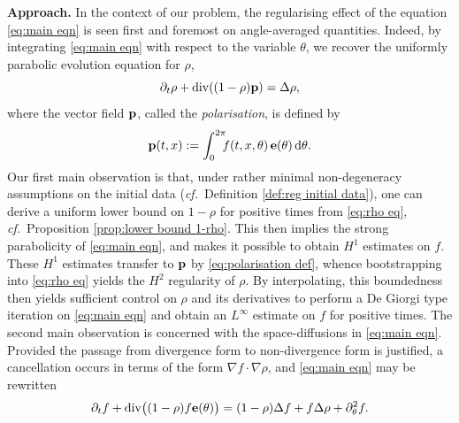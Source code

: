 \documentclass[11pt,a4paper,reqno]{amsart}
\theoremstyle{remark}
\theoremstyle{definition}
\numberwithin{equation}{section}
\DeclareMathOperator{\dv}{div}
\newcommand{\p}{{\bf p}}
\newcommand{\e}{{\bf e}}
\renewcommand{\d}{\, \mathrm{d} }
\begin{document}
\noindent\textbf{Approach.} In the context of our problem, the regularising effect of the equation \eqref{eq:main eqn} is seen first and foremost on angle-averaged quantities. Indeed, by integrating \eqref{eq:main eqn} with respect to the variable $\theta$, we recover the uniformly parabolic evolution equation for $\rho$, 
\begin{equation}\label{eq:rho eq}
    \partial_t \rho + \dv((1-\rho)\p) = \Delta \rho, 
\end{equation}
where the vector field $\p$, called the \emph{polarisation}, is defined by 
\begin{equation}\label{eq:polarisation def}
    \p(t,x) := \int_0^{2\pi} \!\!\! f(t,x,\theta) \, \e(\theta) \d \theta. 
\end{equation}
Our first main observation is that, under rather minimal non-degeneracy assumptions on the initial data (\textit{cf.}~Definition \ref{def:reg initial data}), one can derive a uniform lower bound on $1\!-\!\rho$ for positive times from \eqref{eq:rho eq}, \textit{cf.}~Proposition \ref{prop:lower bound 1-rho}. This then implies the strong parabolicity of \eqref{eq:main eqn}, and makes it possible to obtain $H^1$ estimates on $f$. These $H^1$ estimates transfer to $\p$ by \eqref{eq:polarisation def}, whence bootstrapping into \eqref{eq:rho eq} yields the $H^2$ regularity of $\rho$. By interpolating, this boundedness then yields sufficient control on $\rho$ and its derivatives to perform a De Giorgi type iteration on \eqref{eq:main eqn} and obtain an $L^\infty$ estimate on $f$ for positive times. The second main observation is concerned with the space-diffusions in \eqref{eq:main eqn}. Provided the passage from divergence form to non-divergence form is justified, a cancellation occurs in terms of the form $\nabla f \!\cdot\! \nabla \rho$, and \eqref{eq:main eqn} may be rewritten 
\begin{equation}\label{eq:main eqn non div form}
    \partial_t f + \dv\!\big((1-\rho) f \e(\theta)\big) = (1-\rho)\Delta f + f \Delta \rho + \partial^2_\theta f. 
\end{equation}
\end{document}
